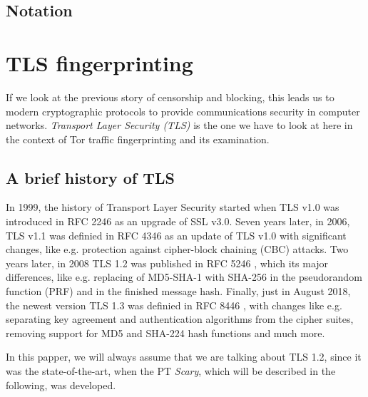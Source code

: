 \documentclass[sigconf, screen]{acmart}
\begin{document}
\subsection{Notation}
\label{ss:notation}
\section{TLS fingerprinting}
\label{s:tlsfingerprinting}
If we look at the previous story of censorship and blocking, this leads us to modern cryptographic protocols to provide communications security in computer networks. \textit{Transport Layer Security (TLS)} \cite{TLS_v1_2} is the one we have to look at here in the context of Tor traffic fingerprinting and its examination.
\subsection{A brief history of TLS}
\label{ss:abriefhistoryoftls}
In 1999, the history of Transport Layer Security started when TLS v1.0 was introduced in RFC 2246 \cite{TLS_v1_0} as an upgrade of SSL v3.0. Seven years later, in 2006, TLS v1.1 was definied in RFC 4346 \cite{TLS_v1_1} as an update of TLS v1.0 with significant changes, like e.g. protection against cipher-block chaining (CBC) attacks. Two years later, in 2008 TLS 1.2 was published in RFC 5246 \cite{TLS_v1_2}, which its major differences, like e.g. replacing of MD5-SHA-1 with SHA-256 in the pseudorandom function (PRF) and in the finished message hash. Finally, just in August 2018, the newest version TLS 1.3 was definied in RFC 8446 \cite{TLS_v1_3}, with changes like e.g. separating key agreement and authentication algorithms from the cipher suites, removing support for MD5 and SHA-224 hash functions and much more.

In this papper, we will always assume that we are talking about TLS 1.2, since it was the state-of-the-art, when the PT \textit{Scary}, which will be described in the following, was developed.
\end{document}
